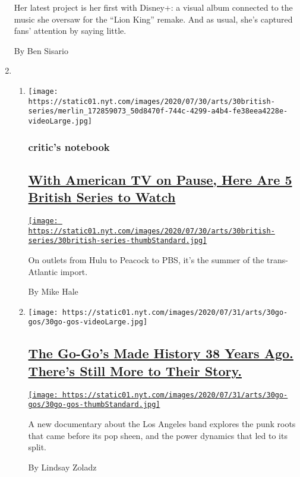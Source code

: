 \begin{enumerate}
  Her latest project is her first with Disney+: a visual album connected
  to the music she oversaw for the ``Lion King'' remake. And as usual,
  she's captured fans' attention by saying little.

  By Ben Sisario
\item
  \begin{enumerate}
  \def\labelenumii{\arabic{enumii}.}
  \item
    \texttt{[image: https://static01.nyt.com/images/2020/07/30/arts/30british-series/merlin\_172859073\_50d8470f-744c-4299-a4b4-fe38eea4228e-videoLarge.jpg]}

    \hypertarget{critics-notebook}{%
    \subsubsection{critic's notebook}\label{critics-notebook}}

    \hypertarget{with-american-tv-on-pause-here-are-5-british-series-to-watch}{%
    \subsection{\texorpdfstring{\href{/2020/07/30/arts/television/in-my-skin-hulu.html}{With
    American TV on Pause, Here Are 5 British Series to
    Watch}}{With American TV on Pause, Here Are 5 British Series to Watch}}\label{with-american-tv-on-pause-here-are-5-british-series-to-watch}}

    \href{/2020/07/30/arts/television/in-my-skin-hulu.html}{\texttt{[image: https://static01.nyt.com/images/2020/07/30/arts/30british-series/30british-series-thumbStandard.jpg]}}

    On outlets from Hulu to Peacock to PBS, it's the summer of the
    trans-Atlantic import.

    By Mike Hale
  \item
    \texttt{[image: https://static01.nyt.com/images/2020/07/31/arts/30go-gos/30go-gos-videoLarge.jpg]}

    \hypertarget{the-go-gos-made-history-38-years-ago-theres-still-more-to-their-story}{%
    \subsection{\texorpdfstring{\href{/2020/07/29/arts/music/the-go-gos-documentary.html}{The
    Go-Go's Made History 38 Years Ago. There's Still More to Their
    Story.}}{The Go-Go's Made History 38 Years Ago. There's Still More to Their Story.}}\label{the-go-gos-made-history-38-years-ago-theres-still-more-to-their-story}}

    \href{/2020/07/29/arts/music/the-go-gos-documentary.html}{\texttt{[image: https://static01.nyt.com/images/2020/07/31/arts/30go-gos/30go-gos-thumbStandard.jpg]}}

    A new documentary about the Los Angeles band explores the punk roots
    that came before its pop sheen, and the power dynamics that led to
    its split.

    By Lindsay Zoladz
  \end{enumerate}
\end{enumerate}


